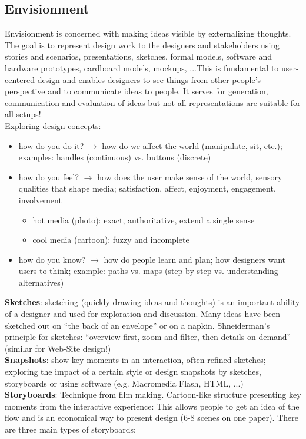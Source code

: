 \subsection{Envisionment}
Envisionment is concerned with making ideas visible by externalizing thoughts. The goal is to represent design work to the designers and stakeholders using stories and scenarios, presentations, sketches, formal models, software and hardware prototypes, cardboard models, mockups, ...This is fundamental to user-centered design and enables designers to see things from other people's perspective and to communicate ideas to people. It serves for generation, communication and evaluation of ideas but not all representations are suitable for all setups!\\
Exploring design concepts:
\begin{itemize}
\item how do you do it? $\rightarrow$ how do we affect the world (manipulate, sit, etc.); examples: handles (continuous) vs. buttons (discrete)
\item how do you feel? $\rightarrow$ how does the user make sense of the world, sensory qualities that shape media; satisfaction, affect, enjoyment, engagement, involvement
\begin{itemize}
\item hot media (photo): exact, authoritative, extend a single sense
\item cool media (cartoon): fuzzy and incomplete
\end{itemize}
\item how do you know? $\rightarrow$ how do people learn and plan; how designers want users to think; example: paths vs. maps (step by step vs. understanding alternatives)
\end{itemize}
\textbf{Sketches}: sketching (quickly drawing ideas and thoughts) is an important ability of a designer and used for exploration and discussion. Many ideas have been sketched out on ``the back of an envelope'' or on a napkin. Shneiderman's principle for sketches: ``overview first, zoom and filter, then details on demand'' (similar for Web-Site design!)\\
\textbf{Snapshots}: show key moments in an interaction, often refined sketches; exploring the impact of a certain style or design snapshots by sketches, storyboards or using software (e.g. Macromedia Flash, HTML, ...)\\
\textbf{Storyboards}: Technique from film making. Cartoon-like structure presenting key moments from the interactive experience: This allows people to get an idea of the flow and is an economical way to present design (6-8 scenes on one paper). There are three main types of storyboards:
